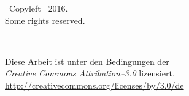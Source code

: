 \thispagestyle{empty}
\vspace*{0in}
\begin{center}
	{\Large{}}\ Copyleft \ThesisAuthor~2016. \\
  Some rights reserved. \\
  \vspace{1in}
  \begin{minipage}[c]{0.2\linewidth}
    \hfill {\Huge \ccLogo~\ccAttribution}
  \end{minipage}
  \hspace{0.1cm}
  \begin{minipage}[c]{0.7\linewidth}
    Diese Arbeit ist unter den Bedingungen der \\
    \textit{Creative Commons Attribution--3.0} lizensiert. \\
    \url{http://creativecommons.org/licenses/by/3.0/de}
  \end{minipage}
\end{center}
\vspace{6cm}
\ThesisThanks
\clearpage
